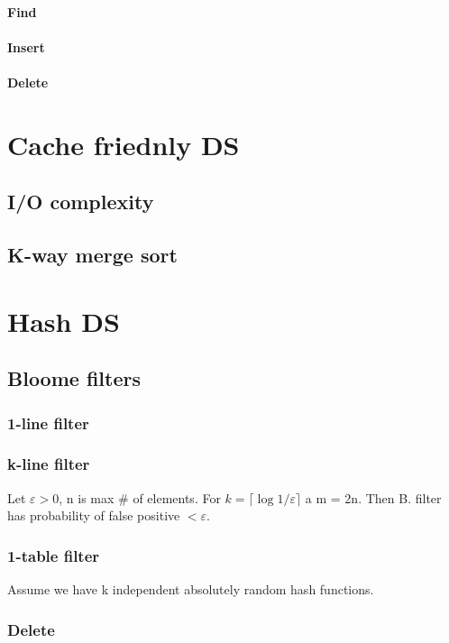 \documentclass[12pt]{article}
\begin{document}
\paragraph{Find}
\paragraph{Insert}
\paragraph{Delete}

\section{Cache friednly DS}
\subsection{I/O complexity}
\subsection{K-way merge sort}


\section{Hash DS}

\subsection{Bloome filters}
\subsubsection{1-line filter}
\subsubsection{k-line filter}

Let $ \varepsilon > 0 $, n is max \# of elements. For $ k = \lceil \log 1/\varepsilon \rceil $ a m = 2n. Then B. filter has probability of false positive $ < \varepsilon $.

\subsubsection{1-table filter}
Assume we have k independent absolutely random hash functions.

\subsubsection{Delete}
\end{document}
